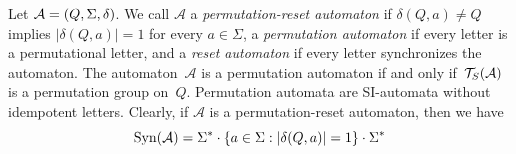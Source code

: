 
Let $\mathcal A = (Q, \Sigma, \delta)$.
We call $\mathcal A$ a
\emph{permutation-reset automaton}  
if 	$\delta(Q, a) \ne Q$ implies $|\delta(Q, a)| = 1$
for every $a \in \Sigma$,
a \emph{permutation automaton} if every letter is a permutational letter,
and a \emph{reset automaton} if every letter synchronizes the automaton.
The automaton~$\mathcal A$ is a permutation automaton if and only if~$\mathcal T_S(\mathcal A)$ is a permutation group on~$Q$.
Permutation automata are SI-automata
without idempotent letters. Clearly, if $\mathcal A$ is a permutation-reset automaton, then
we have
\begin{equation} \label{prelim:perm:fact:synA}
	\operatorname{Syn}(\mathcal A) = \Sigma^* \cdot \{ a \in \Sigma : |\delta(Q, a)| = 1 \} \cdot \Sigma^*
\end{equation}


